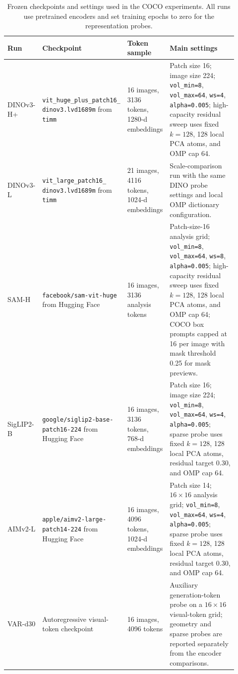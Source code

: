 \documentclass{article}
\begin{document}
\begin{table}[H]
\centering
\scriptsize
\caption{Frozen checkpoints and settings used in the COCO experiments. All runs use pretrained encoders and set training epochs to zero for the representation probes.}
\label{tab:checkpoint-settings}
\setlength{\tabcolsep}{3pt}
\begin{tabular}{@{}p{0.13\linewidth}p{0.31\linewidth}p{0.18\linewidth}p{0.30\linewidth}@{}}
\toprule
Run & Checkpoint & Token sample & Main settings \\
\midrule
DINOv3-H+ &
\texttt{vit\_huge\_plus\_patch16\_}\newline
\texttt{dinov3.lvd1689m} from \texttt{timm} &
16 images, 3136 tokens, 1280-d embeddings &
Patch size 16; image size 224; \texttt{vol\_min=8}, \texttt{vol\_max=64}, \texttt{ws=4}, \texttt{alpha=0.005}; high-capacity residual sweep uses fixed $k=128$, 128 local PCA atoms, and OMP cap 64. \\
DINOv3-L &
\texttt{vit\_large\_patch16\_}\newline
\texttt{dinov3.lvd1689m} from \texttt{timm} &
21 images, 4116 tokens, 1024-d embeddings &
Scale-comparison run with the same DINO probe settings and local OMP dictionary configuration. \\
SAM-H &
\texttt{facebook/sam-vit-huge} from Hugging Face &
16 images, 3136 analysis tokens &
Patch-size-16 analysis grid; \texttt{vol\_min=8}, \texttt{vol\_max=64}, \texttt{ws=8}, \texttt{alpha=0.005}; high-capacity residual sweep uses fixed $k=128$, 128 local PCA atoms, and OMP cap 64; COCO box prompts capped at 16 per image with mask threshold 0.25 for mask previews. \\
SigLIP2-B &
\texttt{google/siglip2-base-patch16-224} from Hugging Face &
16 images, 3136 tokens, 768-d embeddings &
Patch size 16; image size 224; \texttt{vol\_min=8}, \texttt{vol\_max=64}, \texttt{ws=4}, \texttt{alpha=0.005}; sparse probe uses fixed $k=128$, 128 local PCA atoms, residual target 0.30, and OMP cap 64. \\
AIMv2-L &
\texttt{apple/aimv2-large-patch14-224} from Hugging Face &
16 images, 4096 tokens, 1024-d embeddings &
Patch size 14; $16\times16$ analysis grid; \texttt{vol\_min=8}, \texttt{vol\_max=64}, \texttt{ws=4}, \texttt{alpha=0.005}; sparse probe uses fixed $k=128$, 128 local PCA atoms, residual target 0.30, and OMP cap 64. \\
VAR-d30 &
Autoregressive visual-token checkpoint &
16 images, 4096 tokens &
Auxiliary generation-token probe on a $16\times16$ visual-token grid; geometry and sparse probes are reported separately from the encoder comparisons. \\
\bottomrule
\end{tabular}
\end{table}
\end{document}
